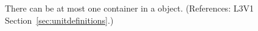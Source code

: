 There can be at most one  container in a \UnitDefinition
object.  (References: L3V1 Section~\ref{sec:unitdefinitions}.)
